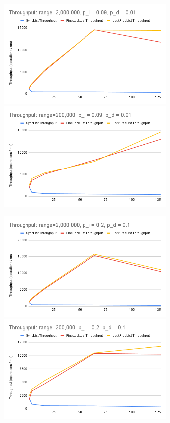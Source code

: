 \documentclass[11pt]{article}
\begin{document}
\begin{figure}[h!]
\includegraphics[width=3.4in]{Throughput range=2,000,000, p_i = 0.09, p_d = 0.01.png}
\includegraphics[width=3.4in]{Throughput range=200,000, p_i = 0.09, p_d = 0.01.png}

\includegraphics[width=3.4in]{Throughput range=2,000,000, p_i = 0.2, p_d = 0.1.png}
\includegraphics[width=3.4in]{Throughput range=200,000, p_i = 0.2, p_d = 0.1.png}


\end{figure}
\end{document}
